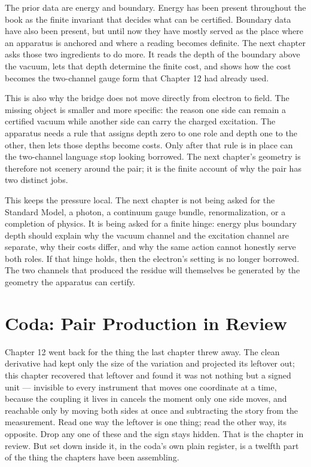 The prior data are energy and boundary. Energy has been present throughout the
book as the finite invariant that decides what can be certified. Boundary data
have also been present, but until now they have mostly served as the place
where an apparatus is anchored and where a reading becomes definite. The next
chapter asks those two ingredients to do more. It reads the depth of the
boundary above the vacuum, lets that depth determine the finite cost, and shows
how the cost becomes the two-channel gauge form that Chapter 12 had already
used.

This is also why the bridge does not move directly from electron to field. The
missing object is smaller and more specific: the reason one side can remain a
certified vacuum while another side can carry the charged excitation. The
apparatus needs a rule that assigns depth zero to one role and depth one to the
other, then lets those depths become costs. Only after that rule is in place can
the two-channel language stop looking borrowed. The next chapter's geometry is
therefore not scenery around the pair; it is the finite account of why the pair
has two distinct jobs.

This keeps the pressure local. The next chapter is not being asked for the
Standard Model, a photon, a continuum gauge bundle, renormalization, or a
completion of physics. It is being asked for a finite hinge: energy plus
boundary depth should explain why the vacuum channel and the excitation channel
are separate, why their costs differ, and why the same action cannot honestly
serve both roles. If that hinge holds, then the electron's setting is no longer
borrowed. The two channels that produced the residue will themselves be
generated by the geometry the apparatus can certify.

\section*{Coda: Pair Production in Review}

Chapter 12 went back for the thing the last chapter threw away. The clean derivative had kept only the size of the variation and projected its leftover out; this chapter recovered that leftover and found it was not nothing but a signed unit --- invisible to every instrument that moves one coordinate at a time, because the coupling it lives in cancels the moment only one side moves, and reachable only by moving both sides at once and subtracting the story from the measurement. Read one way the leftover is one thing; read the other way, its opposite. Drop any one of these and the sign stays hidden. That is the chapter in review. But set down inside it, in the coda's own plain register, is a twelfth part of the thing the chapters have been assembling.

